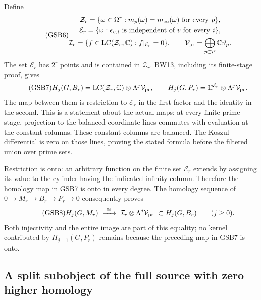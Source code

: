 Define
\begin{equation}\tag{GSB6}
\begin{gathered}
\mathcal Z_r=\{\omega\in\Omega^r:m_p(\omega)=m_\infty(\omega)
                                      \text{ for every }p\},\\
\mathcal E_r=\{\omega:\epsilon_{v,i}\text{ is independent of }v
                                          \text{ for every }i\},\\
\mathcal I_r=\{f\in\operatorname{LC}(\mathcal Z_r,\mathbb C):
                                     f|_{\mathcal E_r}=0\},\qquad
\mathcal V_{\rm pr}=\bigoplus_{p\in\mathcal P}\mathbb C\vartheta_p.
\end{gathered}
\end{equation}
The set $\mathcal E_r$ has $2^r$ points and is contained in
$\mathcal Z_r$. BW13, including its finite-stage proof, gives
\begin{equation}\tag{GSB7}
H_j(G,B_r)=\operatorname{LC}(\mathcal Z_r,\mathbb C)
                     \otimes\Lambda^j\mathcal V_{\rm pr},\qquad
H_j(G,P_r)=\mathbb C^{\mathcal E_r}
                     \otimes\Lambda^j\mathcal V_{\rm pr}.
\end{equation}
The map between them is restriction to $\mathcal E_r$ in the first
factor and the identity in the second. This is a statement about
the actual maps: at every finite prime stage, projection to the
balanced coordinate lines commutes with evaluation at the constant
columns. These constant columns are balanced. The Koszul differential
is zero on those lines, proving the stated formula before the
filtered union over prime sets.

Restriction is onto: an arbitrary function on the finite set
$\mathcal E_r$ extends by assigning its value to the cylinder having
the indicated infinity column. Therefore the homology map in GSB7
is onto in every degree. The homology sequence of
$0\to M_r\to B_r\to P_r\to0$ consequently proves
\begin{equation}\tag{GSB8}
H_j(G,M_r)\ \xrightarrow{\ \cong\ }\
\mathcal I_r\otimes\Lambda^j\mathcal V_{\rm pr}
\ \subset H_j(G,B_r)\qquad(j\ge0).
\end{equation}
Both injectivity and the entire image are part of this equality;
no kernel contributed by $H_{j+1}(G,P_r)$ remains because the
preceding map in GSB7 is onto.

\subsection{A split subobject of the full source with zero higher homology}

